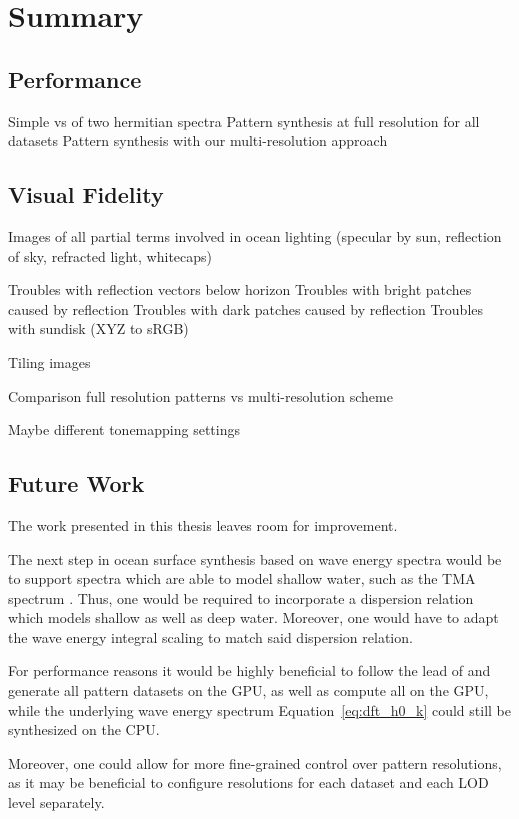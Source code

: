 \chapter{Summary}
\label{ch:summary}

\section{Performance}

Simple \InvFourierTransform vs \InvFourierTransform of two hermitian spectra
Pattern synthesis at full resolution for all datasets
Pattern synthesis with our multi-resolution approach

\section{Visual Fidelity}

Images of all partial terms involved in ocean lighting (specular by sun,
reflection of sky, refracted light, whitecaps)

Troubles with reflection vectors below horizon
Troubles with bright patches caused by reflection
Troubles with dark patches caused by reflection
Troubles with sundisk (XYZ to sRGB)

Tiling images

Comparison full resolution patterns vs multi-resolution scheme

Maybe different tonemapping settings

\section{Future Work}
The work presented in this thesis leaves room for improvement.

The next step in ocean surface synthesis based on wave energy spectra would be
to support spectra which are able to model shallow water, such as the
TMA spectrum \citep{Hughes:1984}.
Thus, one would be required to incorporate a dispersion relation which models
shallow as well as deep water. Moreover, one would have
to adapt the wave energy integral scaling to match said dispersion relation.
\cite{Horvath:2015}

For performance reasons it would be highly beneficial to follow the lead of
\cite{misc:oceanlightingfft} and generate all pattern datasets on the GPU,
as well as compute all \InvDiscreteFourierTransforms on the GPU, while the
underlying wave energy spectrum Equation~\ref{eq:dft_h0_k} could still be synthesized on the CPU.

Moreover, one could allow for more fine-grained control over pattern resolutions,
as it may be beneficial to configure resolutions for each dataset and each LOD
level separately.

